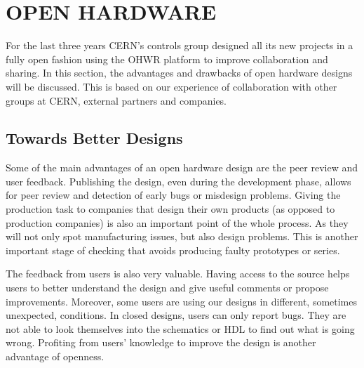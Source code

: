 \documentclass{JAC2003}
\begin{document}
\section{OPEN HARDWARE}
%

For the last three years CERN's controls group designed all its new projects in a fully open fashion using the OHWR platform to improve collaboration and sharing.
In this section, the advantages and drawbacks of open hardware designs will be discussed.
This is based on our experience of collaboration with other groups at CERN, external partners and companies.

\subsection{Towards Better Designs}
Some of the main advantages of an open hardware design are the peer review and user feedback.
Publishing the design, even during the development phase, allows for peer review and detection of early bugs or misdesign problems.
Giving the production task to companies that design their own products (as opposed to production companies) is also an important point of the whole process.
As they will not only spot manufacturing issues, but also design problems.
This is another important stage of checking that avoids producing faulty prototypes or series.

The feedback from users is also very valuable.
Having access to the source helps users to better understand the design and give useful comments or propose improvements.
Moreover, some users are using our designs in different, sometimes unexpected, conditions.
In closed designs, users can only report bugs.
They are not able to look themselves into the schematics or HDL to find out what is going wrong.
Profiting from users' knowledge to improve the design is another advantage of openness.
\end{document}
